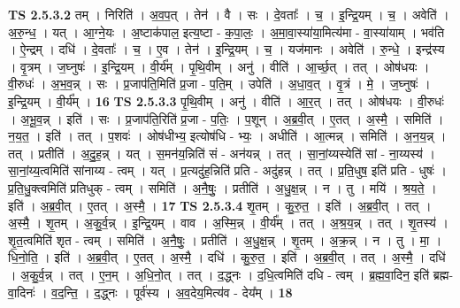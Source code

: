 \documentclass[17pt]{extarticle}
\begin{document}
                  \newline
                                \textbf{ TS 2.5.3.2} \newline
                  तम् । निरिति॑ । अ॒व॒प॒त् । तेन॑ । वै । सः । दे॒वताः᳚ । च॒ । इ॒न्द्रि॒यम् । च॒ । अवेति॑ । अ॒रु॒न्ध॒ । यत् । आ॒ग्ने॒यः । अ॒ष्टाक॑पाल॒ इत्य॒ष्टा - क॒पा॒लः॒ । अ॒मा॒वा॒स्या॑या॒मित्य॑मा - वा॒स्या॑याम् । भव॑ति । ऐ॒न्द्रम् । दधि॑ । दे॒वताः᳚ । च॒ । ए॒व । तेन॑ । इ॒न्द्रि॒यम् । च॒ । यज॑मानः । अवेति॑ । रु॒न्धे॒ । इन्द्र॑स्य । वृ॒त्रम् । ज॒घ्नुषः॑ । इ॒न्द्रि॒यम् । वी॒र्य᳚म् । पृ॒थि॒वीम् । अनु॑ । वीति॑ । आ॒र्च्छ॒त् । तत् । ओष॑धयः । वी॒रुधः॑ । अ॒भ॒व॒न्न् । सः । प्र॒जाप॑ति॒मिति॑ प्र॒जा - प॒ति॒म् । उपेति॑ । अ॒धा॒व॒त् । वृ॒त्रं । मे॒ । ज॒घ्नुषः॑ । इ॒न्द्रि॒यम् । वी॒र्य᳚म् । \textbf{  16} \newline
                  \newline
                                \textbf{ TS 2.5.3.3} \newline
                  पृ॒थि॒वीम् । अनु॑ । वीति॑ । आ॒र॒त् । तत् । ओष॑धयः । वी॒रुधः॑ । अ॒भू॒व॒न्न् । इति॑ । सः । प्र॒जाप॑ति॒रिति॑ प्र॒जा - प॒तिः॒ । प॒शून् । अ॒ब्र॒वी॒त् । ए॒तत् । अ॒स्मै॒ । समिति॑ । न॒य॒त॒ । इति॑ । तत् । प॒शवः॑ । ओष॑धीभ्य॒ इत्योष॑धि - भ्यः॒ । अधीति॑ । आ॒त्मन्न् । समिति॑ । अ॒न॒य॒न्न् । तत् । प्रतीति॑ । अ॒दु॒ह॒न्न् । यत् । स॒मन॑य॒न्निति॑ सं - अन॑यन्न् । तत् । सा॒नां॒य्यस्येति॑ सां - ना॒य्यस्य॑ । सा॒नां॒य्य॒त्वमिति॑ सांनाय्य - त्वम् । यत् । प्र॒त्यदु॑ह॒न्निति॑ प्रति - अदु॑हन्न् । तत् । प्र॒ति॒धुष॒ इति॑ प्रति - धुषः॑ । प्र॒ति॒धु॒क्त्वमिति॑ प्रतिधुक् - त्वम् । समिति॑ । अ॒नै॒षुः॒ । प्रतीति॑ । अ॒धु॒क्ष॒न्न् । न । तु । मयि॑ । श्र॒य॒ते॒ । इति॑ । अ॒ब्र॒वी॒त् । ए॒तत् । अ॒स्मै॒ । \textbf{  17} \newline
                  \newline
                                \textbf{ TS 2.5.3.4} \newline
                  शृ॒तम् । कु॒रु॒त॒ । इति॑ । अ॒ब्र॒वी॒त् । तत् । अ॒स्मै॒ । शृ॒तम् । अ॒कु॒र्व॒न्न् । इ॒न्द्रि॒यम् । वाव । अ॒स्मि॒न्न् । वी॒र्य᳚म् । तत् । अ॒श्र॒य॒न्न् । तत् । शृ॒तस्य॑ । शृ॒त॒त्वमिति॑ शृत - त्वम् । समिति॑ । अ॒नै॒षुः॒ । प्रतीति॑ । अ॒धु॒क्ष॒न्न् । शृ॒तम् । अ॒क्र॒न्न् । न । तु । मा॒ । धि॒नो॒ति॒ । इति॑ । अ॒ब्र॒वी॒त् । ए॒तत् । अ॒स्मै॒ । दधि॑ । कु॒रु॒त॒ । इति॑ । अ॒ब्र॒वी॒त् । तत् । अ॒स्मै॒ । दधि॑ । अ॒कु॒र्व॒न्न् । तत् । ए॒न॒म् । अ॒धि॒नो॒त् । तत् । द॒द्ध्नः । द॒धि॒त्वमिति॑ दधि - त्वम् । ब्र॒ह्म॒वा॒दिन॒ इति॑ ब्रह्म-वा॒दिनः॑ । व॒द॒न्ति॒ । द॒द्ध्नः । पूर्व॑स्य । अ॒व॒देय॒मित्य॑व - देय᳚म् । \textbf{  18} \newline
                  \newline
\end{document}
